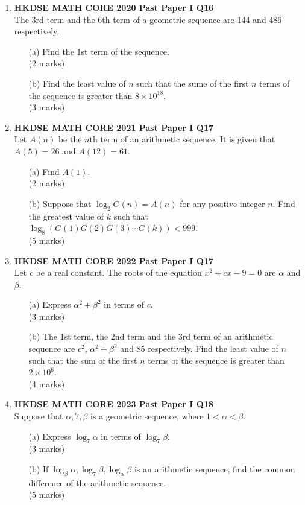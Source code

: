 \documentclass[12pt]{article}
\begin{document}
\begin{enumerate}
    \item \textbf{HKDSE MATH CORE 2020 Past Paper I Q16}\\
	The 3rd term and the 6th term of a geometric sequence are 144 and 486 respectively.
	\begin{enumerate}
		\item[(a)] Find the 1st term of the sequence. \\(2 marks) 
		\item[(b)] Find the least value of $n$ such that the sume of the first $n$ terms of the sequence is greater than $8 \times 10^{18}$. \\(3 marks)
	\end{enumerate}

    \item \textbf{HKDSE MATH CORE 2021 Past Paper I Q17}\\
	Let $A(n)$ be the $n$th term of an arithmetic sequence. It is given that $A(5) = 26$ and $A(12) = 61$.
	\begin{enumerate}
		\item[(a)] Find $A(1)$. \\(2 marks)
		\item[(b)] Suppose that $\log_2{G(n)} = A(n)$ for any positive integer $n$. Find the greatest value of $k$ such that $\log_8{\left(G(1)G(2)G(3)\cdots G(k)\right) < 999}$. \\(5 marks)
	\end{enumerate}

    \item \textbf{HKDSE MATH CORE 2022 Past Paper I Q17}\\
	Let $c$ be a real constant. The roots of the equation $x^2 + cx - 9 = 0$ are $\alpha$ and $\beta$.
	\begin{enumerate}
		\item[(a)] Express $\alpha^2 + \beta^2$ in terms of $c$. \\(3 marks)
		\item[(b)] The 1st term, the 2nd term and the 3rd term of an arithmetic sequence are $c^2$, $\alpha^2 + \beta^2$ and 85 respectively. Find the least value of $n$ such that the sum of the first $n$ terms of the sequence is greater than $2 \times 10^6$. \\(4 marks)
	\end{enumerate}

    \item \textbf{HKDSE MATH CORE 2023 Past Paper I Q18}\\
	Suppose that $\alpha , 7 , \beta $ is a geometric sequence, where $1 < \alpha < \beta$.
	\begin{enumerate}
		\item[(a)] Express $\log_7{\alpha}$ in terms of $\log_7{\beta}$. \\(3 marks)
		\item[(b)] If $\log_{\beta}{\alpha}, \log_{7}{\beta}, \log_{\alpha}{\beta}$ is an arithmetic sequence, find the common difference of the arithmetic sequence. \\(5 marks)
	\end{enumerate}


\end{enumerate}
\end{document}
